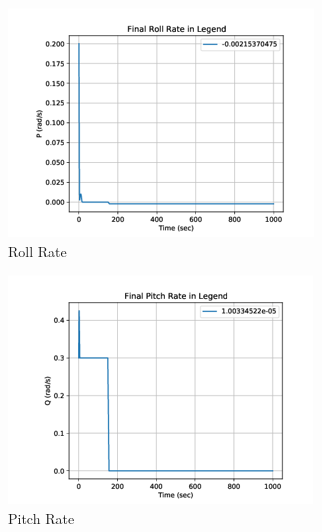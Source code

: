 \documentclass[conf]{new-aiaa}
\begin{document}
\begin{figure}[H]
     \centering
     \begin{subfigure}[b]{0.3\textwidth}
         \centering
         \includegraphics[width=\textwidth]{Figures/2StageControl/Roll_NonDiaganol.png}
         \caption{Roll Rate}
         \label{fig:NonDiagonal_Roll}
     \end{subfigure}
     \hfill
     \begin{subfigure}[b]{0.3\textwidth}
         \centering
         \includegraphics[width=\textwidth]{Figures/2StageControl/Pitch_NonDiaganol.png}
         \caption{Pitch Rate}
         \label{fig:NonDiagonal_Pitch}
     \end{subfigure}
     \hfill
     \begin{subfigure}[b]{0.3\textwidth}

\end{subfigure}
\end{figure}
\end{document}
